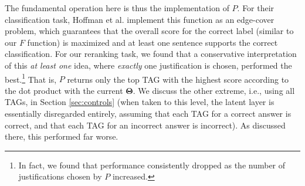 The fundamental operation here is thus the implementation of $P$. For their classification task, Hoffman et al. implement this function as an edge-cover problem, which guarantees that the overall score for the correct label (similar to our $F$ function) is maximized and at least one sentence supports the correct classification.  
For our reranking task, we found that a conservative interpretation of this {\em at least one} idea, where {\em exactly} one justification is chosen, performed the best.\footnote{In fact, we found that performance consistently dropped as the number of justifications chosen by $P$ increased.} That is, $P$ returns only the top TAG with the highest score according to the dot product with the current $\boldsymbol{\Theta}$. 
We discuss the other extreme, i.e., using all TAGs, in Section \ref{sec:controls} (when taken to this level, the latent layer is essentially disregarded entirely, assuming that each TAG for a correct answer is correct, and that each TAG for an incorrect answer is incorrect).  As discussed there, this performed far worse.


